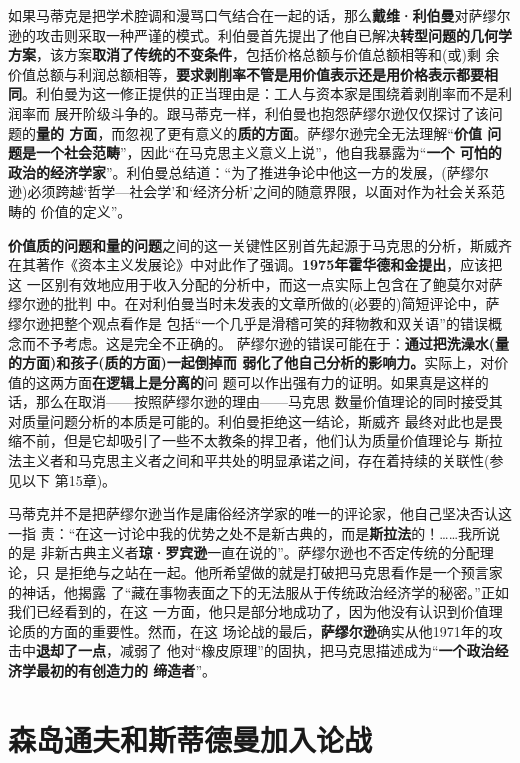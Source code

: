 如果马蒂克是把学术腔调和漫骂口气结合在一起的话，那么\textbf{戴维·利伯曼}对萨缪尔
逊的攻击则采取一种严谨的模式。利伯曼首先提出了他自已解决\textbf{转型问题的几何学
  方案}，该方案\textbf{取消了传统的不变条件}，包括价格总额与价值总额相等和(或)剩
余价值总额与利润总额相等，\textbf{要求剥削率不管是用价值表示还是用价格表示都要相
  同}。利伯曼为这一修正提供的正当理由是：工人与资本家是围绕着剥削率而不是利润率而
展开阶级斗争的。跟马蒂克一样，利伯曼也抱怨萨缪尔逊仅仅探讨了该问题的\textbf{量的
  方面}，而忽视了更有意义的\textbf{质的方面}。萨缪尔逊完全无法理解“\textbf{价值
  问题是一个社会范畴}”，因此“在马克思主义意义上说”，他自我暴露为“\textbf{一个
  可怕的政治的经济学家}”。利伯曼总结道：“为了推进争论中他这一方的发展，(萨缪尔
逊)必须跨越‘哲学—社会学’和‘经济分析’之间的随意界限，以面对作为社会关系范畴的
价值的定义”。

\textbf{价值质的问题和量的问题}之间的这一关键性区别首先起源于马克思的分析，斯威齐
在其著作《资本主义发展论》中对此作了强调。\textbf{1975年霍华德和金提出}，应该把这
一区别有效地应用于收入分配的分析中，而这一点实际上包含在了鲍莫尔对萨缪尔逊的批判
中。在对利伯曼当时未发表的文章所做的(必要的)简短评论中，萨缪尔逊把整个观点看作是
包括“一个几乎是滑稽可笑的拜物教和双关语”的错误概念而不予考虑。这是完全不正确的。
萨缪尔逊的错误可能在于：\textbf{通过把洗澡水(量的方面)和孩子(质的方面)一起倒掉而
  弱化了他自己分析的影响力。}实际上，对价值的这两方面\textbf{在逻辑上是分离的}问
题可以作出强有力的证明。如果真是这样的话，那么在取消——按照萨缪尔逊的理由——马克思
数量价值理论的同时接受其对质量问题分析的本质是可能的。利伯曼拒绝这一结论，斯威齐
最终对此也是畏缩不前，但是它却吸引了一些不太教条的捍卫者，他们认为质量价值理论与
斯拉法主义者和马克思主义者之间和平共处的明显承诺之间，存在着持续的关联性(参见以下
第15章)。

马蒂克并不是把萨缪尔逊当作是庸俗经济学家的唯一的评论家，他自己坚决否认这一指
责：“在这一讨论中我的优势之处不是新古典的，而是\textbf{斯拉法}的！……我所说的是
非新古典主义者\textbf{琼·罗宾逊}一直在说的”。萨缪尔逊也不否定传统的分配理论，只
是拒绝与之站在一起。他所希望做的就是打破把马克思看作是一个预言家的神话，他揭露
了“藏在事物表面之下的无法服从于传统政治经济学的秘密。”正如我们已经看到的，在这
一方面，他只是部分地成功了，因为他没有认识到价值理论质的方面的重要性。然而，在这
场论战的最后，\textbf{萨缪尔逊}确实从他1971年的攻击中\textbf{退却了一点}，减弱了
他对“橡皮原理”的固执，把马克思描述成为“\textbf{一个政治经济学最初的有创造力的
  缔造者}”。

\section{森岛通夫和斯蒂德曼加入论战}

